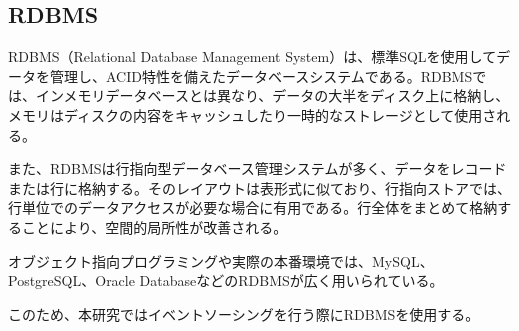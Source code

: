 \documentclass[../../../main]{subfiles}
\begin{document}
    \subsection{RDBMS}\label{subsec:phraseology-rdbms}

    RDBMS（Relational Database Management System）は、標準SQL\cite{ゼロから始めるデータベース操作}を使用してデータを管理し、ACID特性\cite{詳説データベース}を備えたデータベースシステムである。RDBMSでは、インメモリデータベースとは異なり、データの大半をディスク上に格納し、メモリはディスクの内容をキャッシュしたり一時的なストレージとして使用される。

    また、RDBMSは行指向型データベース管理システムが多く、データをレコードまたは行に格納する。そのレイアウトは表形式に似ており、行指向ストアでは、行単位でのデータアクセスが必要な場合に有用である。行全体をまとめて格納することにより、空間的局所性が改善される。\cite{詳説データベース}

    オブジェクト指向プログラミング\cite{現場で役立つシステム設計の原則}や実際の本番環境では、MySQL\cite{MySQL}、PostgreSQL\cite{PostgreSQL}、Oracle Database\cite{OracleDB}などのRDBMSが広く用いられている。

    このため、本研究ではイベントソーシングを行う際にRDBMSを使用する。
\end{document}
